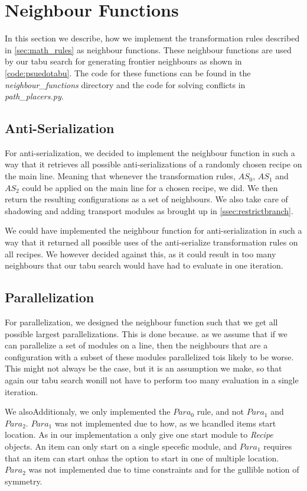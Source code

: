 \section{Neighbour Functions}
In this section we describe, how we implement the transformation rules described in \cref{sec:math_rules} as neighbour functions. These neighbour functions are used by our tabu search for generating frontier neighbours as shown in \cref{code:psuedotabu}. The code for these functions can be found in the \textit{neighbour\_functions} directory and the code for solving conflicts in \textit{path\_placers.py}.


\subsection{Anti-Serialization}
For anti-serialization, we decided to implement the neighbour function in such a way that it retrieves all possible anti-serializations of a randomly chosen recipe on the main line. Meaning that whenever the transformation rules, $AS_0$, $AS_1$ and $AS_2$ could be applied on the main line for a chosen recipe, we did. We then return the resulting configurations as a set of neighbours. We also take care of shadowing and adding transport modules as brought up in \cref{ssec:restrictbranch}.

We could have implemented the neighbour function for anti-serialization in such a way that it returned all possible uses of the anti-serialize transformation rules on all recipes. We however decided against this, as it could result in too many neighbours that our tabu search would have had to evaluate in one iteration.


\subsection{Parallelization}
For parallelization, we designed the neighbour function such that we get all possible largest parallelizations. This is done because. as we assume that if we can parallelize a set of modules on a line, then the neighbours that are a configuration with a subset of these modules parallelized tois likely to be worse. This might not always be the case, but it is an assumption we make, so that again our tabu search wonill not have to perform too many evaluation in a single iteration. 

We alsoAdditionaly, we only implemented the $Para_0$ rule, and not $Para_1$ and $Para_2$. $Para_1$ was not implemented due to how, as we hcandled items start location. As in our implementation a only give one start module to \textit{Recipe} objects. An item can only start on a single specefic module, and $Para_1$ requires that an item can start onhas the option to start in one of multiple location. $Para_2$ was not implemented due to time constraints and for the gullible notion of symmetry.


